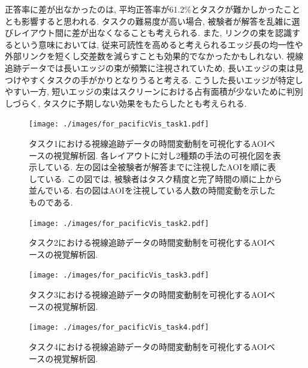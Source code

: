 \documentclass{kuee}
\begin{document}
正答率に差が出なかったのは, 平均正答率が61.2\%とタスクが難かしかったこととも影響すると思われる.
タスクの難易度が高い場合, 被験者が解答を乱雑に選びレイアウト間に差が出なくなることも考えられる.
また, リンクの束を認識するという意味においては, 従来可読性を高めると考えられるエッジ長の均一性や外部リンクを短くし交差数を減らすことも効果的でなかったかもしれない.
視線追跡データでは長いエッジの束が頻繁に注視されていため, 長いエッジの束は見つけやすくタスクの手がかりとなりうると考える.
こうした長いエッジが特定しやすい一方, 短いエッジの束はスクリーンにおける占有面積が少ないために判別しづらく, タスクに予期しない効果をもたらしたとも考えられる.


\begin{figure}
  \begin{center}
    \texttt{[image: ./images/for\_pacificVis\_task1.pdf]}
    \caption{タスク1における視線追跡データの時間変動制を可視化するAOIベースの視覚解析図.
    各レイアウトに対し2種類の手法の可視化図を表示している.
    左の図は全被験者が解答までに注視したAOIを順に表している.
    この図では, 被験者はタスク精度と完了時間の順に上から並んでいる.
    右の図はAOIを注視している人数の時間変動を示したものである.\label{fig:AOI-based-analisys1}}
  \end{center}
\end{figure}

\begin{figure}
  \begin{center}
    \texttt{[image: ./images/for\_pacificVis\_task2.pdf]}
    \caption{タスク2における視線追跡データの時間変動制を可視化するAOIベースの視覚解析図. \label{fig:AOI-based-analisys2}}
  \end{center}
\end{figure}

\begin{figure}
  \begin{center}
    \texttt{[image: ./images/for\_pacificVis\_task3.pdf]}
    \caption{タスク3における視線追跡データの時間変動制を可視化するAOIベースの視覚解析図. \label{fig:AOI-based-analisys3}}
  \end{center}
\end{figure}

\begin{figure}
  \begin{center}
    \texttt{[image: ./images/for\_pacificVis\_task4.pdf]}
    \caption{タスク4における視線追跡データの時間変動制を可視化するAOIベースの視覚解析図. \label{fig:AOI-based-analisys4}}
  \end{center}
\end{figure}
\end{document}
